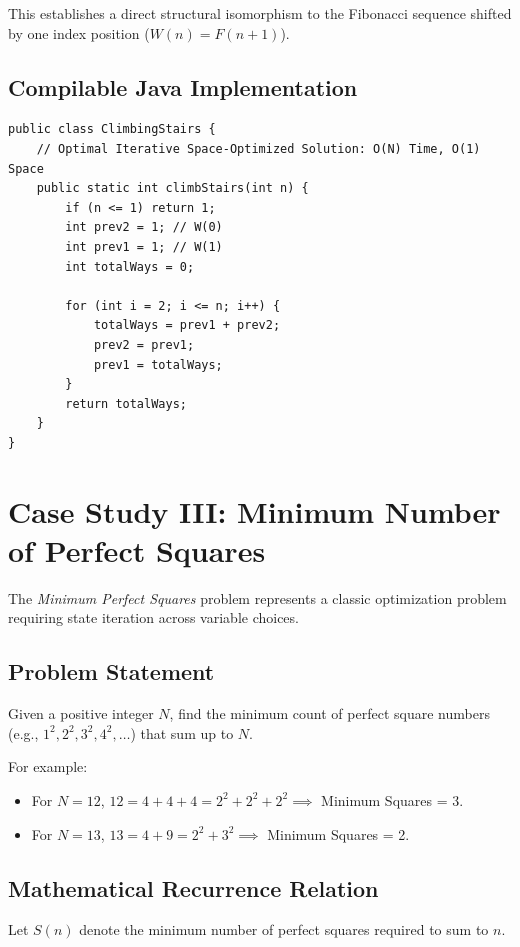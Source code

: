 \documentclass[10pt,journal,compsoc,onecolumn]{IEEEtran}
\begin{document}
This establishes a direct structural isomorphism to the Fibonacci sequence shifted by one index position ($W(n) = F(n+1)$).

\subsection{Compilable Java Implementation}

\begin{verbatim}
public class ClimbingStairs {
    // Optimal Iterative Space-Optimized Solution: O(N) Time, O(1) Space
    public static int climbStairs(int n) {
        if (n <= 1) return 1;
        int prev2 = 1; // W(0)
        int prev1 = 1; // W(1)
        int totalWays = 0;

        for (int i = 2; i <= n; i++) {
            totalWays = prev1 + prev2;
            prev2 = prev1;
            prev1 = totalWays;
        }
        return totalWays;
    }
}
\end{verbatim}


\section{Case Study III: Minimum Number of Perfect Squares}
\label{sec:min-squares}

The \emph{Minimum Perfect Squares} problem represents a classic optimization problem requiring state iteration across variable choices.

\subsection{Problem Statement}

Given a positive integer $N$, find the minimum count of perfect square numbers (e.g., $1^2, 2^2, 3^2, 4^2, \dots$) that sum up to $N$.

For example:
\begin{itemize}
    \item For $N = 12$, $12 = 4 + 4 + 4 = 2^2 + 2^2 + 2^2 \implies$ Minimum Squares = 3.
    \item For $N = 13$, $13 = 4 + 9 = 2^2 + 3^2 \implies$ Minimum Squares = 2.
\end{itemize}

\subsection{Mathematical Recurrence Relation}

Let $S(n)$ denote the minimum number of perfect squares required to sum to $n$.
\end{document}
